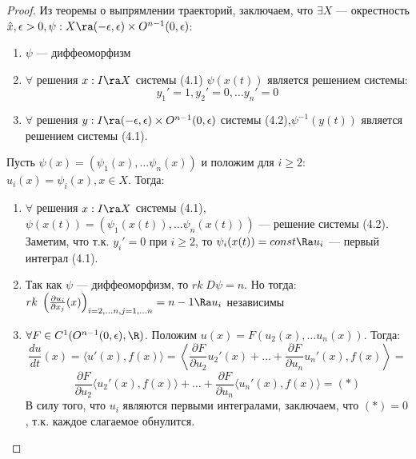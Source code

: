 \begin{proof}
    Из теоремы о выпрямлении траекторий, заключаем, что \(\exists X\) --- окрестность \(\hat{x}, \epsilon > 0, \psi: X \ra (-\epsilon, \epsilon) \times O^{n - 1}(0, \epsilon)\):
    \begin{enumerate}
        \item \(\psi\) --- диффеоморфизм
        \item \(\forall\) решения \(x: I \ra X\) системы (4.1) \(\psi(x(t))\) является решением системы:
        \begin{equation}
            y_1' = 1, y_2' = 0, \dots y_n' = 0
        \end{equation}
        \item \(\forall\) решения \(y: I \ra (-\epsilon, \epsilon) \times O^{n - 1}(0, \epsilon)\) системы (4.2),\(\psi^{-1}(y(t))\) является решением системы (4.1).
    \end{enumerate}
    Пусть \(\psi(x) = (\psi_1(x), \dots \psi_n(x))\) и положим для \(i \ge 2\): \(u_i(x) = \psi_i(x), x \in X\). Тогда:
    \begin{enumerate}
        \item \(\forall\) решения \(x: I \ra X\) системы (4.1), \(\psi(x(t)) =  (\psi_1(x(t)), \dots \psi_n(x(t)))\) --- решение системы (4.2). Заметим, что т.к. \(y_i' = 0\) при \(i \ge 2\), то \(\psi_i(x(t)) = const \Ra u_i\) --- первый интеграл (4.1).
        \item Так как \(\psi\) --- диффеоморфизм, то \(rk\;D\psi = n\). Но тогда: \(rk\;\left( \frac{\partial u_i}{\partial x_j}(x) \right)_{i = 2,\dots n, j = 1,\dots n} = n - 1 \Ra u_i\) независимы
        \item \(\forall F \in C^1(O^{n - 1}(0, \epsilon), \R)\). Положим \(u(x) = F(u_2(x), \dots u_n(x))\). Тогда:
        \[\frac{du}{dt}(x) = \langle u'(x), f(x) \rangle = \left\langle \frac{\partial F}{\partial u_2}u_2'(x) + \dots + \frac{\partial F}{\partial u_n}u_n'(x), f(x) \right\rangle =\]
        \[\frac{\partial F}{\partial u_2}\langle u_2'(x), f(x)\rangle + \dots + \frac{\partial F}{\partial u_n}\langle u_n'(x), f(x)\rangle = (*)\]
        В силу того, что \(u_i\) являются первыми интегралами, заключаем, что \((*) = 0\), т.к. каждое слагаемое обнулится.


\end{enumerate}
\end{proof}
